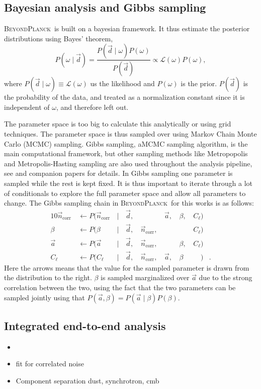 \documentclass[twocolumn]{aa}
\renewcommand{\d}[0]{\vec{d}}
\newcommand{\n}[0]{\vec{n}}
\renewcommand{\a}[0]{\vec{a}}
\newcommand{\BP}{\textsc{BeyondPlanck}}
\begin{document}
\subsection{Bayesian analysis and Gibbs sampling}
\BP\ is built on a bayesian framework. It thus estimate the posterior distributions using Bayes' theorem, %
%
\begin{equation}
  P(\omega\mid \d) = \frac{P(\d\mid \omega)P(\omega)}{P(\d)} \propto
  \mathcal{L}(\omega)P(\omega),
  \label{eq:jointpost}
\end{equation}
%
where $P(\d\mid \omega)\equiv\mathcal{L}(\omega)$ us the likelihood and $P(\omega)$ is the prior. $P(\d)$ is the probability of the data, and treated as a normalization constant since it is independent of $\omega$, and therefore left out. 

The parameter space is too big to calculate this analytically or using grid techniques. The parameter space is thus sampled over using Markov Chain Monte Carlo (MCMC) sampling. Gibbs sampling, aMCMC sampling algorithm, is the main computational framework, but other sampling methods like Metropopolis and Metropolis-Hasting sampling are also used throughout the analysis pipeline, see \cite{BP01} and companion papers for details. In Gibbs sampling one parameter  is sampled while  the rest  is kept fixed. It is thus important to iterate through a lot of conditionals to explore the full parameter space and allow all parameters to change. The Gibbs sampling chain in \BP\ for this works is as follows:
%
\begin{alignat}{10}
\n_{\mathrm{corr}} 	&\,\leftarrow P(\n_{\mathrm{corr}}	&\,\mid &\,\d, &\, 				&\,\a,	&\,\beta, 	&\,C_{\ell})\\
\beta 			&\,\leftarrow P(\beta				&\,\mid &\,\d, &\,\n_{\mathrm{corr}}, 	&\, 	&\,		&\,C_{\ell})\\
\a 				&\,\leftarrow P(\a				&\,\mid &\,\d, &\,\n_{\mathrm{corr}}, 	&\,	&\,\beta, 	&\,C_{\ell})\\
C_{\ell} 			&\,\leftarrow P(C_{\ell}			&\,\mid &\,\d, &\,\n_{\mathrm{corr}}, 	&\,\a,	&\,\beta	&\,\phantom{C_{\ell}})&.
\end{alignat}
%
Here the arrows means that the value for the sampled parameter is drawn from the distribution to the right. $\beta$ is sampled marginalized over $\a$ due to the strong correlation between the two, using the fact that the two parameters can be sampled jointly using that $P(\a, \beta)=P(\a \mid \beta)P(\beta)$. 

\subsection{Integrated end-to-end analysis}
\begin{itemize}
\item 	
\item fit for correlated noise
\item Component separation dust, synchrotron, cmb
\end{itemize}
\end{document}
